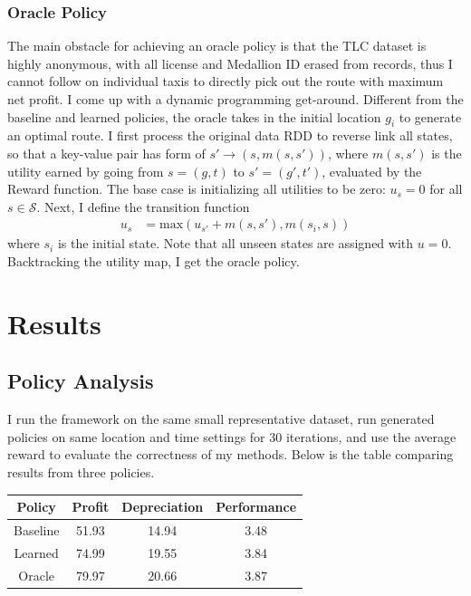 \documentclass[letterpaper, 10 pt, conference]{ieeeconf}
\begin{document}
\subsubsection{Oracle Policy}
The main obstacle for achieving an oracle policy is that the TLC dataset is highly anonymous, with all license and Medallion ID erased from records, thus I cannot follow on individual taxis to directly pick out the route with maximum net profit. I come up with a dynamic programming get-around. Different from the baseline and learned policies, the oracle takes in the initial location $g_i$ to generate an optimal route. I first process the original data RDD to reverse link all states, so that a key-value pair has form of $s'\to(s,m(s,s'))$, where $m(s,s')$ is the utility earned by going from $s=(g,t)$ to $s'=(g',t')$, evaluated by the Reward function. The base case is initializing all utilities to be zero: $u_s=0$ for all $s\in\mathcal{S}$. Next, I define the transition function
\begin{align}
u_s &= \text{max}(u_{s'}+m(s, s'), m(s_i, s))
\end{align}
where $s_i$ is the initial state. Note that all unseen states are assigned with $u=0$. Backtracking the utility map, I get the oracle policy.
\section{Results}
\subsection{Policy Analysis}
I run the framework on the same small representative dataset, run generated policies on same location and time settings for 30 iterations, and use the average reward to evaluate the correctness of my methods. Below is the table comparing results from three policies.
\begin{center}
\begin{tabular}{|c||c|c|c|}
\hline
Policy & Profit & Depreciation & Performance \\ \hline
Baseline & 51.93 & 14.94 & 3.48 \\    \hline
Learned & 74.99 & 19.55 & 3.84 \\    \hline
Oracle & 79.97 & 20.66 & 3.87 \\    \hline
\end{tabular}
\end{center}
\end{document}
